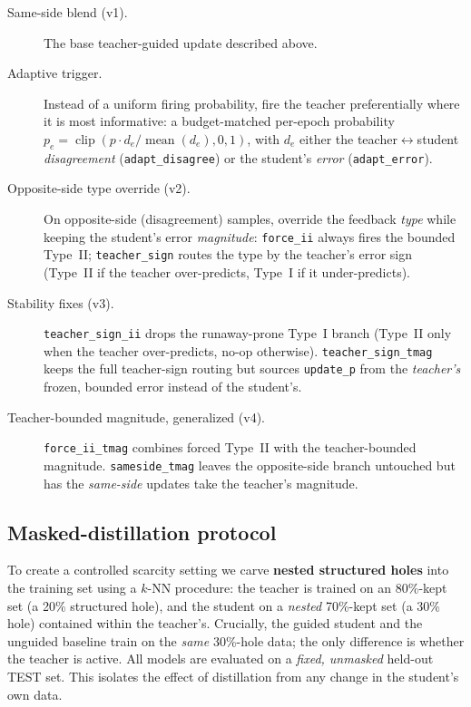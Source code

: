 \begin{description}
  \item[Same-side blend (v1).] The base teacher-guided update described above.
  \item[Adaptive trigger.] Instead of a uniform firing probability, fire the teacher
    preferentially where it is most informative: a budget-matched per-epoch probability
    $p_e = \operatorname{clip}(p \cdot d_e / \operatorname{mean}(d_e), 0, 1)$, with $d_e$
    either the teacher$\leftrightarrow$student \emph{disagreement}
    (\texttt{adapt\_disagree}) or the student's \emph{error} (\texttt{adapt\_error}).
  \item[Opposite-side type override (v2).] On opposite-side (disagreement) samples,
    override the feedback \emph{type} while keeping the student's error \emph{magnitude}:
    \texttt{force\_ii} always fires the bounded Type~II; \texttt{teacher\_sign} routes
    the type by the teacher's error sign (Type~II if the teacher over-predicts, Type~I if
    it under-predicts).
  \item[Stability fixes (v3).] \texttt{teacher\_sign\_ii} drops the runaway-prone Type~I
    branch (Type~II only when the teacher over-predicts, no-op otherwise).
    \texttt{teacher\_sign\_tmag} keeps the full teacher-sign routing but sources
    \texttt{update\_p} from the \emph{teacher's} frozen, bounded error instead of the
    student's.
  \item[Teacher-bounded magnitude, generalized (v4).] \texttt{force\_ii\_tmag} combines
    forced Type~II with the teacher-bounded magnitude. \texttt{sameside\_tmag} leaves the
    opposite-side branch untouched but has the \emph{same-side} updates take the teacher's
    magnitude.
\end{description}

\subsection{Masked-distillation protocol}

To create a controlled scarcity setting we carve \textbf{nested structured holes} into
the training set using a $k$-NN procedure: the teacher is trained on an 80\%-kept set (a
20\% structured hole), and the student on a \emph{nested} 70\%-kept set (a 30\% hole)
contained within the teacher's. Crucially, the guided student and the unguided baseline
train on the \emph{same} 30\%-hole data; the only difference is whether the teacher is
active. All models are evaluated on a \emph{fixed, unmasked} held-out TEST set. This
isolates the effect of distillation from any change in the student's own data.

